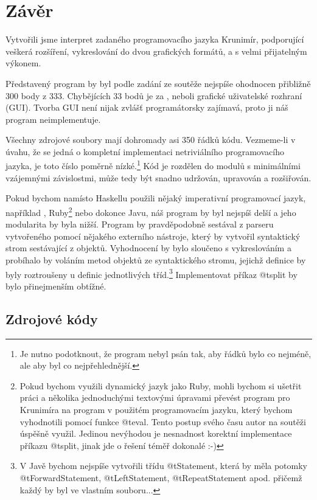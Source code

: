 \section{Závěr}

Vytvořili jsme interpret zadaného programovacího jazyka Krunimír, podporující
veškerá rozšíření, vykreslování do dvou grafických formátů, a s velmi
přijatelným výkonem.

Představený program by byl podle zadání ze soutěže nejspíše ohodnocen přibližně
300 body z 333.  Chybějících 33 bodů je za , neboli
grafické uživatelské rozhraní (GUI). Tvorba GUI není nijak zvlášť
programátorsky zajímavá, proto ji náš program neimplementuje.

Všechny zdrojové soubory mají dohromady asi 350 řádků kódu. Vezmeme-li v úvahu,
že se jedná o kompletní implementaci netriviálního programovacího jazyka, je
toto číslo poměrně nízké.\footnote{Je nutno podotknout, že program nebyl psán
  tak, aby řádků bylo co nejméně, ale aby byl co nejpřehlednější.} Kód je
rozdělen do modulů s minimálními vzájemnými závislostmi, může tedy být snadno
udržován, upravován a rozšiřován.

Pokud bychom namísto Haskellu použili nějaký imperativní programovací jazyk,
například \Cplusplus{}, Ruby\footnote{
  Pokud bychom využili dynamický jazyk jako
  Ruby, mohli bychom si ušetřit práci a několika jednoduchými textovými úpravami
  převést program pro Krunimíra na program v použitém programovacím jazyku,
  který bychom vyhodnotili pomocí funkce @t{eval}. Tento postup svého času autor
  na soutěži úspěšně využil.  Jedinou nevýhodou je nesnadnost korektní
  implementace příkazu @t{split}, jinak jde o řešení téměř dokonalé :-) 
} nebo dokonce Javu, náš program by byl nejspíš delší a jeho modularita by byla
nižší. Program by pravděpodobně sestával z parseru vytvořeného pomocí nějakého
externího nástroje, který by vytvořil syntaktický strom sestávající z objektů.
Vyhodnocení by bylo sloučeno s vykreslováním a probíhalo by voláním metod
objektů ze syntaktického stromu, jejichž definice by byly roztroušeny u definic
jednotlivých tříd.\footnote{
  V Javě bychom nejspíše vytvořili třídu @t{Statement}, která by měla potomky
  @t{ForwardStatement}, @t{LeftStatement}, @t{RepeatStatement} apod. přičemž
  každý by byl ve vlastním souboru...  
  } Implementovat příkaz @t{split} by bylo přinejmenším obtížné.

\subsection{Zdrojové kódy}

